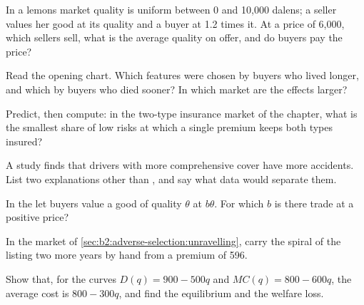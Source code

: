 \begin{exercise}[$\star$]\label{exo:b2:adverse-selection:1}
In a lemons market quality is uniform between 0 and 10{,}000 dalens; a seller values her good at its quality and a buyer at 1.2
times it. At a price of 6{,}000, which sellers sell, what is the average quality on offer, and do buyers pay the price?
\end{exercise}

\begin{exercise}[$\star$]\label{exo:b2:adverse-selection:2}
Read the opening chart. Which features were chosen by buyers who lived longer, and which by buyers who died sooner? In which
market are the effects larger?
\end{exercise}

\begin{exercise}[$\star$]\label{exo:b2:adverse-selection:3}
Predict, then compute: in the two-type insurance market of the chapter, what is the smallest share of low risks at which a
single premium keeps both types insured?
\end{exercise}

\begin{exercise}[$\star$]\label{exo:b2:adverse-selection:4}
A study finds that drivers with more comprehensive cover have more accidents. List two explanations other than , and say what data would separate them.
\end{exercise}

\begin{exercise}[$\star\star$]\label{exo:b2:adverse-selection:5}
In the  let buyers value a good of quality $\theta$ at $b\theta$. For which $b$ is there trade at a positive price?
\end{exercise}

\begin{exercise}[$\star\star$]\label{exo:b2:adverse-selection:6}
In the market of \cref{sec:b2:adverse-selection:unravelling}, carry the spiral of the listing two more years by hand from a
premium of 596.
\end{exercise}

\begin{exercise}[$\star\star$]\label{exo:b2:adverse-selection:7}
Show that, for the curves $D(q) = 900 - 500q$ and $\mathit{MC}(q) = 800 - 600q$, the average cost is $800 - 300q$, and find the equilibrium and the
welfare loss.
\end{exercise}

